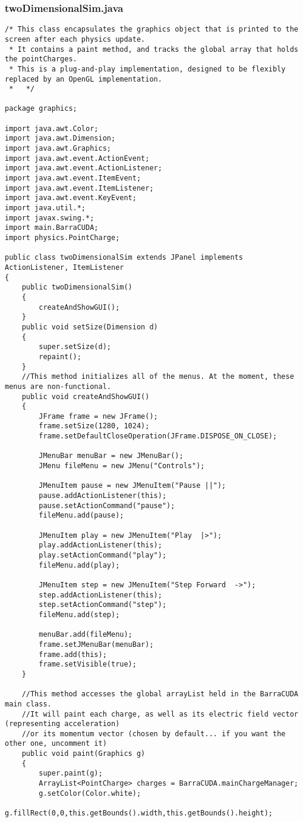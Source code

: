 \documentclass[10pt]{article}
\begin{document}
\subsubsection{twoDimensionalSim.java}
\tiny
\begin{verbatim}
/* This class encapsulates the graphics object that is printed to the screen after each physics update.
 * It contains a paint method, and tracks the global array that holds the pointCharges.
 * This is a plug-and-play implementation, designed to be flexibly replaced by an OpenGL implementation.
 *   */

package graphics;

import java.awt.Color;
import java.awt.Dimension;
import java.awt.Graphics;
import java.awt.event.ActionEvent;
import java.awt.event.ActionListener;
import java.awt.event.ItemEvent;
import java.awt.event.ItemListener;
import java.awt.event.KeyEvent;
import java.util.*;
import javax.swing.*;
import main.BarraCUDA;
import physics.PointCharge;

public class twoDimensionalSim extends JPanel implements ActionListener, ItemListener
{
	public twoDimensionalSim()
	{
		createAndShowGUI();	
	}
	public void setSize(Dimension d)
	{
		super.setSize(d);
		repaint();
	}
	//This method initializes all of the menus. At the moment, these menus are non-functional.
	public void createAndShowGUI()
	{
		JFrame frame = new JFrame();
		frame.setSize(1280, 1024);
		frame.setDefaultCloseOperation(JFrame.DISPOSE_ON_CLOSE);
			
		JMenuBar menuBar = new JMenuBar();
		JMenu fileMenu = new JMenu("Controls");
		
		JMenuItem pause = new JMenuItem("Pause ||");
		pause.addActionListener(this);
		pause.setActionCommand("pause");
		fileMenu.add(pause);
		
		JMenuItem play = new JMenuItem("Play  |>");
		play.addActionListener(this);
		play.setActionCommand("play");
		fileMenu.add(play);
		
		JMenuItem step = new JMenuItem("Step Forward  ->");
		step.addActionListener(this);
		step.setActionCommand("step");
		fileMenu.add(step);
		
		menuBar.add(fileMenu);
		frame.setJMenuBar(menuBar);
		frame.add(this);
		frame.setVisible(true);
	}
	
	//This method accesses the global arrayList held in the BarraCUDA main class. 
	//It will paint each charge, as well as its electric field vector (representing acceleration)
	//or its momentum vector (chosen by default... if you want the other one, uncomment it) 
	public void paint(Graphics g)
	{
		super.paint(g);
		ArrayList<PointCharge> charges = BarraCUDA.mainChargeManager;
		g.setColor(Color.white);
		g.fillRect(0,0,this.getBounds().width,this.getBounds().height);
		

\end{verbatim}
\end{document}

